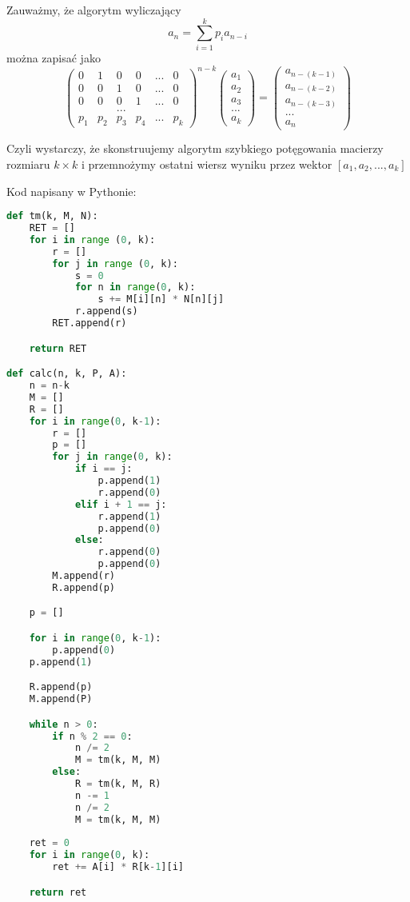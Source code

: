 \documentclass{article}[13pt]
\begin{document}
Zauważmy, że algorytm wyliczający
$$a_n=\sum\limits_{i=1}^kp_ia_{n-i}$$
można zapisać jako
$$
\begin{pmatrix}
    0 & 1 & 0 & 0 & ... & 0\\
    0 & 0 & 1 & 0 & ... & 0\\
    0 & 0 & 0 & 1 & ... & 0\\
    & & ... \\
    p_1 & p_2 & p_3 & p_4 & ... & p_k
\end{pmatrix}^{n-k}
\begin{pmatrix}
    a_1\\
    a_2\\
    a_3\\
    ...\\
    a_k
\end{pmatrix}=
\begin{pmatrix}
    a_{n-(k-1)}\\
    a_{n-(k-2)}\\
    a_{n-(k-3)}\\
    ...\\
    a_{n}
\end{pmatrix}
$$

Czyli wystarczy, że skonstruujemy algorytm szybkiego potęgowania macierzy rozmiaru $k\times k$ i przemnożymy ostatni wiersz wyniku przez wektor $[a_1,a_2,...,a_k]$
\bigskip

Kod napisany w Pythonie:

\begin{lstlisting}[language=Python]
def tm(k, M, N):
    RET = []
    for i in range (0, k):
        r = []
        for j in range (0, k):
            s = 0
            for n in range(0, k):
                s += M[i][n] * N[n][j]
            r.append(s)
        RET.append(r)

    return RET

def calc(n, k, P, A):
    n = n-k
    M = []
    R = []
    for i in range(0, k-1):
        r = []
        p = []
        for j in range(0, k):
            if i == j:
                p.append(1)
                r.append(0)
            elif i + 1 == j:
                r.append(1)
                p.append(0)
            else:
                r.append(0)
                p.append(0)
        M.append(r)
        R.append(p)

    p = []

    for i in range(0, k-1):
        p.append(0)
    p.append(1)

    R.append(p)
    M.append(P)

    while n > 0:
        if n % 2 == 0:
            n /= 2
            M = tm(k, M, M)
        else:
            R = tm(k, M, R)
            n -= 1
            n /= 2
            M = tm(k, M, M)
    
    ret = 0
    for i in range(0, k):
        ret += A[i] * R[k-1][i]

    return ret
\end{lstlisting}
\end{document}
